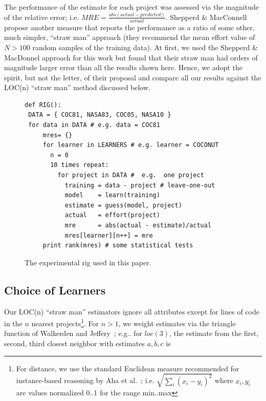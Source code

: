 \documentclass{sig-alternate}
\begin{document}
The performance of the estimate for each project was
assessed via the magnitude of the relative error; i.e. 
\mbox{$ \mathit{MRE}=\frac{abs(\mathit{actual} - \mathit{predicted})}{\mathit{actual}}$}. 
Shepperd \& MacConnell~\cite{shepperd12a} propose
another measure that reports the performance as a
ratio of some other, much
simpler, ``straw man'' approach (they recommend the
mean effort value of $N>100$ random samples of the
training data). At first, we used the Shepperd \&
MacDonnel approach for this work but found that
their straw man had orders of magnitude larger error
than all the results shown here. Hence, we adopt the
spirit, but not the letter, of their proposal and
compare all our results against the LOC(n) ``straw
man'' method discussed below.



\begin{figure}[!t]
\begin{lstlisting}
def RIG():
 DATA = { COC81, NASA83, COC05, NASA10 }
 for data in DATA # e.g. data = COC81
     mres= {}
     for learner in LEARNERS # e.g. learner = COCONUT
       n = 0
       10 times repeat: 
         for project in DATA #  e.g.  one project
           training = data - project # leave-one-out
           model    = learn(training)
           estimate = guess(model, project)
           actual   = effort(project)
           mre      = abs(actual - estimate)/actual
           mres[learner][n++] = mre
     print rank(mres) # some statistical tests
\end{lstlisting}
\caption{The experimental rig used in this paper.}\label{fig:rig}
\end{figure}



\subsection{Choice of Learners}\label{sect:whatlearn}

 Our LOC(n) ``straw man'' 
estimators ignore all attributes except for lines of code
in the $n$ nearest projects\footnote{For distance,
we use the standard Euclidean measure recommended for
instance-based reasoning by Aha et al.~\cite{aha91};
i.e. $\sqrt{\sum_i(x_i-y_i)^2}$ where $x_i,y_i$ 
are values normalized 0..1 for the range min..max}. For $n>1$,
we weight estimates via the triangle 
function of  Walkerden
and Jeffery~\cite{Walkerden1999}; 
e.g.. for $loc(3)$, the  estimate
from the first, second, third closest neighbor with estimates
$a,b,c$ is 
\end{document}
